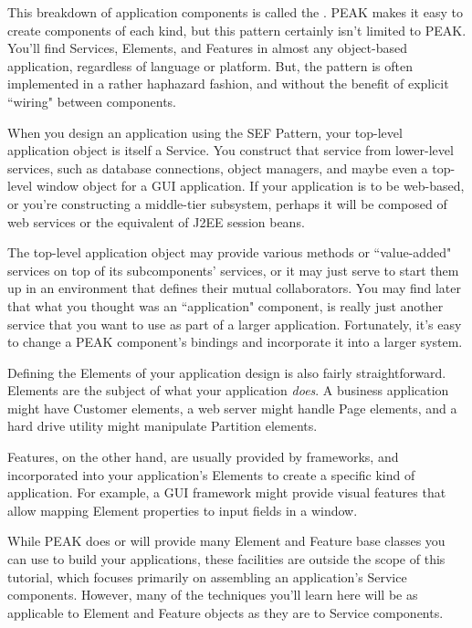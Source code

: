 This breakdown of application components is called the
.  PEAK makes it easy to create 
components of each kind, but this pattern certainly isn't limited to PEAK.
You'll find Services, Elements, and Features in almost any object-based
application, regardless of language or platform.  But, the pattern is often
implemented in a rather haphazard fashion, and without the benefit of explicit
``wiring" between components.

When you design an application using the SEF Pattern, your top-level 
application object is itself a Service.  You construct that service from
lower-level services, such as database connections, object managers,
and maybe even a top-level window object for a GUI application.  If your
application is to be web-based, or you're constructing a middle-tier
subsystem, perhaps it will be composed of web services or the equivalent
of J2EE session beans.

The top-level application object may provide various methods or ``value-added"
services on top of its subcomponents' services, or it may just serve to start
them up in an environment that defines their mutual collaborators.  You may
find later that what you thought was an ``application" component, is really 
just another service that you want to use as part of a larger application.
Fortunately, it's easy to change a PEAK component's bindings and
incorporate it into a larger system.

Defining the Elements of your application design is also fairly
straightforward.  Elements are the subject of what your application
\emph{does}.  A business application might have Customer elements, a web
server might handle Page elements, and a hard drive utility might manipulate
Partition elements.

Features, on the other hand, are usually provided by frameworks, and
incorporated into your application's Elements to create a specific kind of
application.  For example, a GUI framework might provide visual features that
allow mapping Element properties to input fields in a window.

While PEAK does or will provide many Element and Feature base classes you can
use to build your applications, these facilities are outside the scope of
this tutorial, which focuses primarily on assembling an application's Service
components.  However, many of the techniques you'll learn here will be as
applicable to Element and Feature objects as they are to Service components.


